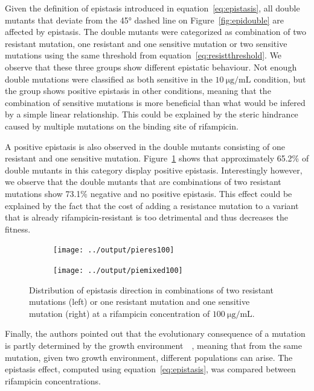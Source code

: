 \documentclass[12pt]{article}
\begin{document}
  Given the definition of epistasis introduced in
  equation~\eqref{eq:epistasis}, all double mutants that deviate from the
  45\si{\degree} dashed line on Figure~\ref{fig:epidouble} are affected by
  epistasis. The double mutants were categorized as combination of two
  resistant mutation, one resistant and one sensitive mutation or two sensitive
  mutations using the same threshold from equation~\eqref{eq:resistthreshold}.
  We observe that these three groups show different epistatic behaviour. Not
  enough double mutations were classified as both sensitive in the
  $\SI{10}{\micro\gram\per\milli\liter}$ condition, but the group shows
  positive epistasis in other conditions, meaning that the combination of
  sensitive mutations is more beneficial than what would be infered by a simple
  linear relationship. This could be explained by the steric hindrance caused
  by multiple mutations on the binding site of rifampicin.

  A positive epistasis is also observed in the double mutants consisting of one
  resistant and one sensitive mutation. Figure~\ref{fig:epidirection} shows
  that approximately 65.2\% of double mutants in this category display positive
  epistasis. Interestingly however, we observe that the double mutants that are
  combinations of two resistant mutations show 73.1\% negative and no positive
  epistasis. This effect could be explained by the fact that the cost of adding
  a resistance mutation to a variant that is already rifampicin-resistant is
  too detrimental and thus decreases the fitness.

  \begin{figure}[!ht]
    \begin{subfigure}{.5\textwidth}
      \centering
      \texttt{[image: ../output/pieres100]}
    \end{subfigure}
    \begin{subfigure}{.5\textwidth}
      \centering
      \texttt{[image: ../output/piemixed100]}
    \end{subfigure}
    \caption{Distribution of epistasis direction in combinations of two
    resistant mutations (left) or one resistant mutation and one sensitive
    mutation (right) at a rifampicin concentration of
    $\SI{100}{\micro\gram\per\milli\liter}$.}%
    \label{fig:epidirection}
  \end{figure}

  Finally, the authors pointed out that the evolutionary consequence of a
  mutation is partly determined by the growth
  environment~\cite{remold2004}~\cite{weinreich2005}, meaning that from the
  same mutation, given two growth environment, different populations can arise.
  The epistasis effect, computed using equation~\eqref{eq:epistasis}, was
  compared between rifampicin concentrations.
\end{document}
